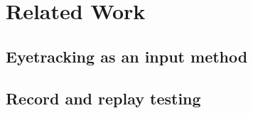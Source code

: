 \section{Related Work}




\subsection{Eyetracking as an input method}

\subsection{Record and replay testing}